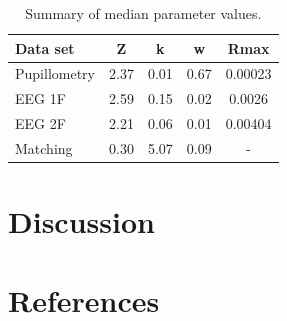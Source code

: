 \documentclass[
]{article}
\begin{document}
\begin{table}

\caption{\label{tab:paramtable}Summary of median parameter values.}
\centering
\begin{tabular}[t]{l|c|c|c|c}
\hline
Data set & Z & k & w & Rmax\\
\hline
Pupillometry & 2.37 & 0.01 & 0.67 & 0.00023\\
\hline
EEG 1F & 2.59 & 0.15 & 0.02 & 0.0026\\
\hline
EEG 2F & 2.21 & 0.06 & 0.01 & 0.00404\\
\hline
Matching & 0.30 & 5.07 & 0.09 & -\\
\hline
\end{tabular}
\end{table}

\hypertarget{discussion}{%
\section{Discussion}\label{discussion}}

\hypertarget{references}{%
\section*{References}\label{references}}
\end{document}

